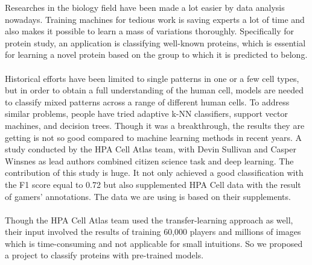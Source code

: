 \documentclass{article}
\begin{document}
Researches in the biology field have been made a lot easier by data analysis nowadays. Training machines for tedious work is saving experts a lot of time and also makes it possible to learn a mass of variations thoroughly. Specifically for protein study, an application is classifying well-known proteins, which is essential for learning a novel protein based on the group to which it is predicted to belong\cite{subcellular}. 
\\\\
Historical efforts have been limited to single patterns in one or a few cell types, but in order to obtain a full understanding of the human cell, models are needed to classify mixed patterns across a range of different human cells. To address similar problems, people have tried adaptive k-NN classifiers\cite{knn}, support vector machines\cite{svm}, and decision trees\cite{dtree}. Though it was a breakthrough, the results they are getting is not so good compared to machine learning methods in recent years. A study conducted by the HPA Cell Atlas team\cite{nature}, with Devin Sullivan and Casper Winsnes as lead authors combined citizen science task and deep learning. The contribution of this study is huge. It not only achieved a good classification with the F1 score equal to 0.72 but also supplemented HPA Cell data with the result of gamers’ annotations. The data we are using is based on their supplements.
\\\\
Though the HPA Cell Atlas team used the transfer-learning approach as well, their input involved the results of training 60,000 players and millions of images which is time-consuming and not applicable for small intuitions. So we proposed a project to classify proteins with pre-trained models.

  
\end{document}
